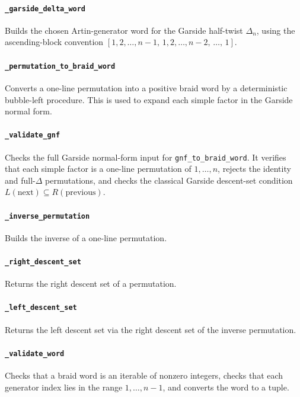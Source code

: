 ﻿\documentclass[10pt]{article}
\begin{document}
\paragraph{\texttt{\_garside\_delta\_word}}
Builds the chosen Artin-generator word for the Garside half-twist \(\Delta_n\), using the ascending-block convention $[1,2,\dots,n-1,\,1,2,\dots,n-2,\,\dots,\,1]$.

\paragraph{\texttt{\_permutation\_to\_braid\_word}}
Converts a one-line permutation into a positive braid word by a deterministic bubble-left procedure.
This is used to expand each simple factor in the Garside normal form.

\paragraph{\texttt{\_validate\_gnf}}
Checks the full Garside normal-form input for \texttt{gnf\_to\_braid\_word}.
It verifies that each simple factor is a one-line permutation of \(1,\dots,n\),
rejects the identity and full-\(\Delta\) permutations, and checks the classical
Garside descent-set condition $L(\text{next}) \subseteq R(\text{previous})$.

\paragraph{\texttt{\_inverse\_permutation}}
Builds the inverse of a one-line permutation.

\paragraph{\texttt{\_right\_descent\_set}}
Returns the right descent set of a permutation.

\paragraph{\texttt{\_left\_descent\_set}}
Returns the left descent set via the right descent set of the inverse permutation.

\paragraph{\texttt{\_validate\_word}}
Checks that a braid word is an iterable of nonzero integers, checks that each
generator index lies in the range \(1,\dots,n-1\), and converts the word to a tuple.
\end{document}

